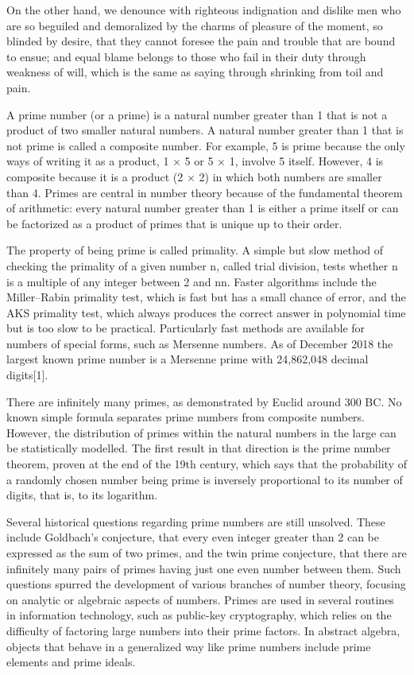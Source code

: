 On the other hand, we denounce with righteous indignation and dislike men who
are so beguiled and demoralized by the charms of pleasure of the moment, so
blinded by desire, that they cannot foresee the pain and trouble that are bound
to ensue; and equal blame belongs to those who fail in their duty through
weakness of will, which is the same as saying through shrinking from toil and
pain.

A prime number (or a prime) is a natural number greater than 1 that is not a
product of two smaller natural numbers. A natural number greater than 1 that is
not prime is called a composite number. For example, 5 is prime because the only
ways of writing it as a product, 1 × 5 or 5 × 1, involve 5 itself. However, 4 is
composite because it is a product (2 × 2) in which both numbers are smaller than
4. Primes are central in number theory because of the fundamental theorem of
arithmetic: every natural number greater than 1 is either a prime itself or can
be factorized as a product of primes that is unique up to their order.

The property of being prime is called primality. A simple but slow method of
checking the primality of a given number n, called trial division, tests whether
n is a multiple of any integer between 2 and { { {n}}}{ {n}}. Faster algorithms
include the Miller–Rabin primality test, which is fast but has a small chance of
error, and the AKS primality test, which always produces the correct answer in
polynomial time but is too slow to be practical. Particularly fast methods are
available for numbers of special forms, such as Mersenne numbers. As of December
2018 the largest known prime number is a Mersenne prime with 24,862,048 decimal
digits[1].

There are infinitely many primes, as demonstrated by Euclid around 300 BC. No
known simple formula separates prime numbers from composite numbers. However,
the distribution of primes within the natural numbers in the large can be
statistically modelled. The first result in that direction is the prime number
theorem, proven at the end of the 19th century, which says that the probability
of a randomly chosen number being prime is inversely proportional to its number
of digits, that is, to its logarithm.

Several historical questions regarding prime numbers are still unsolved. These
include Goldbach's conjecture, that every even integer greater than 2 can be
expressed as the sum of two primes, and the twin prime conjecture, that there
are infinitely many pairs of primes having just one even number between
them. Such questions spurred the development of various branches of number
theory, focusing on analytic or algebraic aspects of numbers. Primes are used in
several routines in information technology, such as public-key cryptography,
which relies on the difficulty of factoring large numbers into their prime
factors. In abstract algebra, objects that behave in a generalized way like
prime numbers include prime elements and prime ideals.
